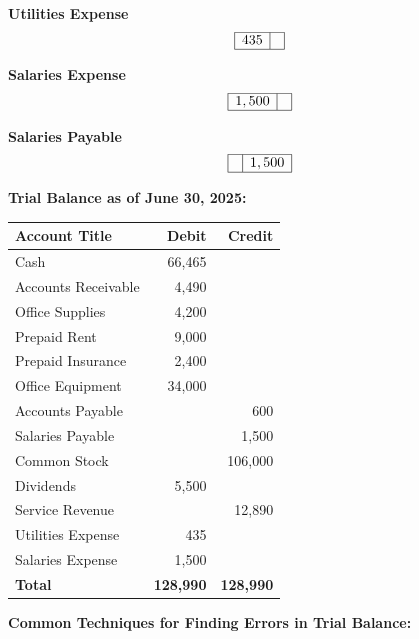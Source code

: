 \documentclass[12pt,a4paper]{book}
\begin{document}
\vspace{0.3cm}
\textbf{Utilities Expense}
\[
\begin{array}{|l|l|}
\hline
435 & \\
\hline
\end{array}
\]

\vspace{0.3cm}
\textbf{Salaries Expense}
\[
\begin{array}{|l|l|}
\hline
1,500 & \\
\hline
\end{array}
\]

\vspace{0.3cm}
\textbf{Salaries Payable}
\[
\begin{array}{|l|l|}
\hline
 & 1,500 \\
\hline
\end{array}
\]

\vspace{0.5cm}
\textbf{Trial Balance as of June 30, 2025:}

\begin{center}
\begin{tabular}{|l|r|r|}
\hline
\textbf{Account Title} & \textbf{Debit} & \textbf{Credit} \\
\hline
Cash & 66,465 & \\
Accounts Receivable & 4,490 & \\
Office Supplies & 4,200 & \\
Prepaid Rent & 9,000 & \\
Prepaid Insurance & 2,400 & \\
Office Equipment & 34,000 & \\
Accounts Payable & & 600 \\
Salaries Payable & & 1,500 \\
Common Stock & & 106,000 \\
Dividends & 5,500 & \\
Service Revenue & & 12,890 \\
Utilities Expense & 435 & \\
Salaries Expense & 1,500 & \\
\hline
\textbf{Total} & \textbf{128,990} & \textbf{128,990} \\
\hline
\end{tabular}
\end{center}

\vspace{1cm}

\textbf{Common Techniques for Finding Errors in Trial Balance:}
\end{document}
